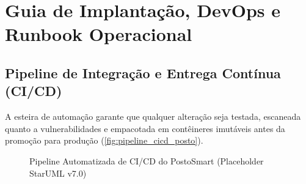 
\chapter{Guia de Implantação, DevOps e Runbook Operacional}
\label{cap:implantacao_devops}

\section{Pipeline de Integração e Entrega Contínua (CI/CD)}

A esteira de automação garante que qualquer alteração seja testada, escaneada quanto a vulnerabilidades e empacotada em contêineres imutáveis antes da promoção para produção (\autoref{fig:pipeline_cicd_posto}).

\begin{figure}[htbp]
    \centering
    \caption{Pipeline Automatizada de CI/CD do PostoSmart (Placeholder StarUML v7.0)}
    \label{fig:pipeline_cicd_posto}
\end{figure}

